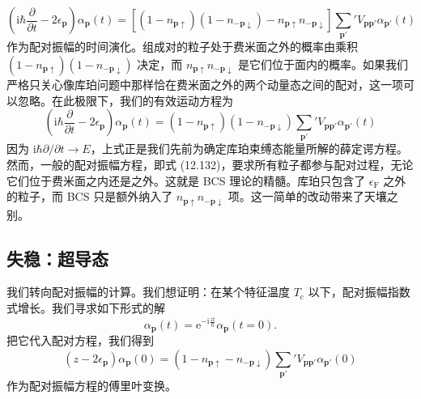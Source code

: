 \begin{equation*}
\left(\mathrm i\hbar\frac{\partial}{\partial t}-2\epsilon_{\mathbf p}\right)\alpha_{\mathbf p}(t)=\left[\left(1-n_{\mathbf p\uparrow}\right)\left(1-n_{-\mathbf p\downarrow}\right)-n_{\mathbf p\uparrow}n_{-\mathbf p\downarrow}\right]{\sum_{\mathbf p'}}'V_{\mathbf p\mathbf p'}\alpha_{\mathbf p'}(t) \tag{12.132}
\end{equation*}
作为配对振幅的时间演化。组成对的粒子处于费米面之外的概率由乘积 $\left(1-n_{\mathbf p\uparrow}\right)\left(1-n_{-\mathbf p\downarrow}\right)$ 决定，而 $n_{\mathbf p\uparrow}n_{-\mathbf p\downarrow}$ 是它们位于面内的概率。如果我们严格只关心像库珀问题中那样恰在费米面之外的两个动量态之间的配对，这一项可以忽略。在此极限下，我们的有效运动方程为
\begin{equation*}
\left(\mathrm i\hbar\frac{\partial}{\partial t}-2\epsilon_{\mathbf p}\right)\alpha_{\mathbf p}(t)=\left(1-n_{\mathbf p\uparrow}\right)\left(1-n_{-\mathbf p\downarrow}\right){\sum_{\mathbf p'}}'V_{\mathbf p\mathbf p'}\alpha_{\mathbf p'}(t) \tag{12.133}
\end{equation*}
因为 $\mathrm i\hbar\partial/\partial t\to E$，上式正是我们先前为确定库珀束缚态能量所解的薛定谔方程。然而，一般的配对振幅方程，即式 (12.132)，要求所有粒子都参与配对过程，无论它们位于费米面之内还是之外。这就是 BCS 理论的精髓。库珀只包含了 $\epsilon_{\mathrm F}$ 之外的粒子，而 BCS 只是额外纳入了 $n_{\mathbf p\uparrow}n_{-\mathbf p\downarrow}$ 项。这一简单的改动带来了天壤之别。

\subsection{失稳：超导态}

我们转向配对振幅的计算。我们想证明：在某个特征温度 $T_{\mathrm c}$ 以下，配对振幅指数式增长。我们寻求如下形式的解
\begin{equation*}
\alpha_{\mathbf p}(t)=\mathrm e^{-\mathrm i\frac{zt}{\hbar}}\alpha_{\mathbf p}(t=0). \tag{12.134}
\end{equation*}
把它代入配对方程，我们得到
\begin{equation*}
\left(z-2\epsilon_{\mathbf p}\right)\alpha_{\mathbf p}(0)=\left(1-n_{\mathbf p\uparrow}-n_{-\mathbf p\downarrow}\right){\sum_{\mathbf p'}}'V_{\mathbf p\mathbf p'}\alpha_{\mathbf p'}(0) \tag{12.135}
\end{equation*}
作为配对振幅方程的傅里叶变换。

